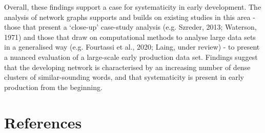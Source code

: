 \documentclass[
  man]{apa6}
\begin{document}
Overall, these findings support a case for systematicity in early development. The analysis of network graphs supports and builds on existing studies in this area - those that present a `close-up' case-study analysis (e.g. Szreder, 2013; Waterson, 1971) and those that draw on computational methods to analyse large data sets in a generalised way (e.g. Fourtassi et al., 2020; Laing, under review) - to present a nuanced evaluation of a large-scale early production data set. Findings suggest that the developing network is characterised by an increasing number of dense clusters of similar-sounding words, and that systematicity is present in early production from the beginning.
\newpage

\hypertarget{references}{%
\section*{References}\label{references}}
\end{document}
